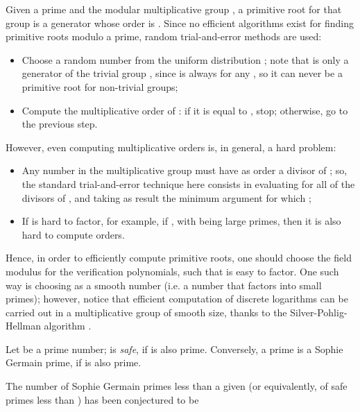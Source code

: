 \documentclass[10pt,journal,cspaper,compsoc]{IEEEtran}
\begin{document}
Given a prime  and the modular multiplicative group , a primitive root for that group is a generator whose order is .
Since no efficient algorithms exist for finding primitive roots modulo a prime, random trial-and-error methods are used:

\begin{itemize}
\item Choose a random number  from the uniform distribution ; note that  is only a generator of the trivial group , since  is always  for any , so it can never be a primitive root for non-trivial groups;
\item Compute the multiplicative order of : if it is equal to , stop; otherwise, go to the previous step.
\end{itemize}

However, even computing multiplicative orders is, in general, a hard problem: 

\begin{itemize}
\item Any number  in the multiplicative group  must have as order a divisor of ; so, the standard trial-and-error technique here consists in evaluating  for all of the divisors of , and taking as result the minimum argument  for which ;
\item If  is hard to factor, for example, if , with  being large primes, then it is also hard to compute orders.
\end{itemize}

Hence, in order to efficiently compute primitive roots, one should choose the field modulus  for the verification polynomials, such that  is easy to factor. One such way is choosing  as a smooth number (i.e. a number that factors into small primes); however, notice that efficient computation of discrete logarithms can be carried out in a multiplicative group of smooth size, thanks to the Silver-Pohlig-Hellman algorithm \cite{Mollin:2008:FNT:1628707}.

\begin{defn}
Let  be a prime number;  is \emph{safe}, if  is also prime.
Conversely, a prime  is a Sophie Germain prime, if  is also prime.
\end{defn}

The number  of Sophie Germain primes less than a given  (or equivalently, of safe primes less than ) has been conjectured \cite{books/daglib/0018101} to be
\end{document}
